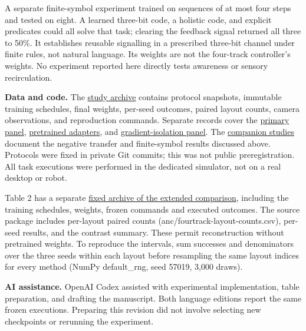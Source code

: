 \documentclass[11pt]{article}
\begin{document}
A separate finite-symbol experiment trained on sequences of at most four steps and tested on eight. A learned three-bit code, a holistic code, and explicit predicates could all solve that task; clearing the feedback signal returned all three to 50\%. It establishes reusable signalling in a prescribed three-bit channel under finite rules, not natural language. Its weights are not the four-track controller's weights. No experiment reported here directly tests awareness or sensory recirculation.

\textbf{Data and code.} The \href{https://github.com/ykykykk/jstp-intervention-bench/tree/9dd500171a8a59b3716ae3802c5b24c40c7d0f1a/studies/joint_primer}{study archive} contains protocol snapshots, immutable training schedules, final weights, per-seed outcomes, paired layout counts, camera observations, and reproduction commands. Separate records cover the \href{https://github.com/ykykykk/jstp-intervention-bench/blob/9dd500171a8a59b3716ae3802c5b24c40c7d0f1a/studies/joint_primer/evidence/analysis/summary.json}{primary panel}, \href{https://github.com/ykykykk/jstp-intervention-bench/blob/9dd500171a8a59b3716ae3802c5b24c40c7d0f1a/studies/joint_primer/evidence/official/analysis/summary.json}{pretrained adapters}, and \href{https://github.com/ykykykk/jstp-intervention-bench/blob/9dd500171a8a59b3716ae3802c5b24c40c7d0f1a/studies/joint_primer/evidence/challenge/results.json}{gradient-isolation panel}. The \href{https://github.com/ykykykk/jstp-intervention-bench/tree/9dd500171a8a59b3716ae3802c5b24c40c7d0f1a/studies}{companion studies} document the negative transfer and finite-symbol results discussed above. Protocols were fixed in private Git commits; this was not public preregistration. All task executions were performed in the dedicated simulator, not on a real desktop or robot.

Table 2 has a separate \href{https://github.com/ykykykk/jstp-intervention-bench/tree/5514eb4c851ec6670a17d8420184b1fc7a98ac2b/studies/fourtrack_foundations}{fixed archive of the extended comparison}, including the training schedules, weights, frozen commands and executed outcomes. The source package includes per-layout paired counts (anc/fourtrack-layout-counts.csv), per-seed results, and the contrast summary. These permit reconstruction without pretrained weights. To reproduce the intervals, sum successes and denominators over the three seeds within each layout before resampling the same layout indices for every method (NumPy default\_rng, seed 57019, 3,000 draws).

\textbf{AI assistance.} OpenAI Codex assisted with experimental implementation, table preparation, and drafting the manuscript. Both language editions report the same frozen executions. Preparing this revision did not involve selecting new checkpoints or rerunning the experiment.
\end{document}

